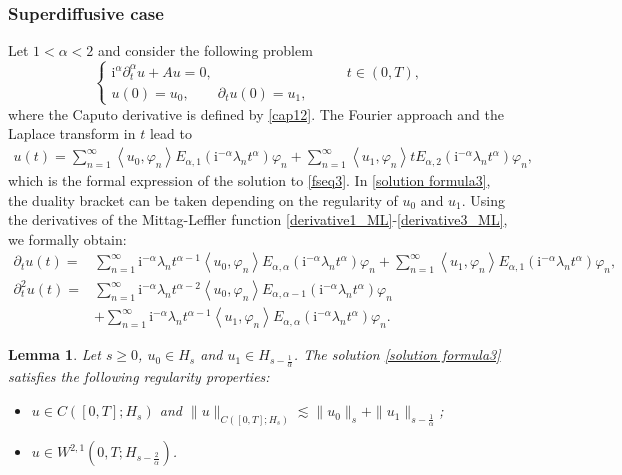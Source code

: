 \documentclass[reqno]{amsart}
\newtheorem{lem}[theorem]{Lemma}
\numberwithin{equation}{section}
\begin{document}
\subsubsection{Superdiffusive case}
Let $1<\alpha<2$ and consider the following problem
\begin{equation}\label{fseq3}
\begin{cases}
\mathrm{i}^{\alpha}\partial_t^\alpha u +Au=0, &\qquad t \in (0,T),\\
u(0)=u_0, \qquad\partial_tu(0)=u_1,
\end{cases}
\end{equation}
where the Caputo derivative is defined by \eqref{cap12}. The Fourier approach and the Laplace transform in $t$ lead to
	\begin{align}\label{solution formula3}
        u(t)=\sum_{n=1}^{\infty}\left\langle u_0, \varphi_n\right\rangle E_{\alpha, 1}\left(\mathrm{i}^{-\alpha}\lambda_n t^\alpha\right) \varphi_n + \sum_{n=1}^{\infty}\left\langle u_1, \varphi_n\right\rangle tE_{\alpha, 2}\left(\mathrm{i}^{-\alpha}\lambda_n t^\alpha\right) \varphi_n,
	\end{align}
which is the formal expression of the solution to \eqref{fseq3}. In \eqref{solution formula3}, the duality bracket can be taken depending on the regularity of $u_0$ and $u_1$.
Using the derivatives of the Mittag-Leffler function \eqref{derivative1_ML}-\eqref{derivative3_ML}, we formally obtain:
\begin{align}
	\partial_t u(t)=&\sum_{n=1}^{\infty}\mathrm{i}^{-\alpha}\lambda_n t^{\alpha-1}\left\langle u_0, \varphi_n\right\rangle E_{\alpha, \alpha}\left(\mathrm{i}^{-\alpha}\lambda_n t^\alpha\right) \varphi_n+ \sum_{n=1}^{\infty}\left\langle u_1, \varphi_n\right\rangle E_{\alpha, 1}\left(\mathrm{i}^{-\alpha}\lambda_n t^\alpha\right) \varphi_n, \label{D2}\\
	\partial_t^2 u(t)=&\sum_{n=1}^{\infty}\mathrm{i}^{-\alpha}\lambda_n t^{\alpha-2}\left\langle u_0, \varphi_n\right\rangle E_{\alpha, \alpha-1}\left(\mathrm{i}^{-\alpha}\lambda_n t^\alpha\right) \varphi_n \nonumber\\
    &+\sum_{n=1}^{\infty}\mathrm{i}^{-\alpha}\lambda_n t^{\alpha-1}\left\langle u_1, \varphi_n\right\rangle E_{\alpha, \alpha}\left(\mathrm{i}^{-\alpha}\lambda_n t^\alpha\right) \varphi_n. \label{D3}
\end{align}
\begin{lem} \label{regularity3}
	Let $s\geq 0$, $u_0\in H_s$ and $u_1\in H_{s-\frac{1}{\alpha}}$. The solution \eqref{solution formula3} satisfies the following regularity properties:
	\begin{itemize}
		\item[(i)] $u\in C([0,T];H_s)$ and $\|u\|_{C([0,T];H_s)}\lesssim \|u_0\|_s + \|u_1\|_{s-\frac{1}{\alpha}}$;
		\item[(ii)] $u\in W^{2,1}\left(0,T; H_{s-\frac{2}{\alpha}}\right)$.
	\end{itemize}
\end{lem}
\end{document}
